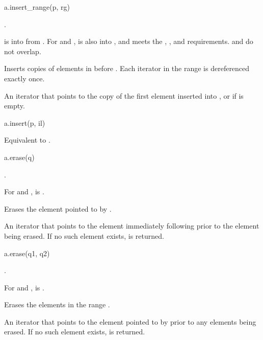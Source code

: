 %
\begin{itemdecl}
a.insert_range(p, rg)
\end{itemdecl}

\begin{itemdescr}
\pnum
\result
{}.

\pnum
\expects
{} is  into 
from .
For  and ,
 is also
 into ,
and  meets the
,
, and
 requirements.
 and  do not overlap.

\pnum
\effects
Inserts copies of elements in  before .
Each iterator in the range  is dereferenced exactly once.

\pnum
\returns
An iterator
that points to the copy of the first element inserted into , or
 if  is empty.
\end{itemdescr}

\begin{itemdecl}
a.insert(p, il)
\end{itemdecl}

\begin{itemdescr}
\pnum
\effects
Equivalent to .
\end{itemdescr}

%
\begin{itemdecl}
a.erase(q)
\end{itemdecl}

\begin{itemdescr}
\pnum
\result
{}.

\pnum
\expects
For  and ,
 is .

\pnum
\effects
Erases the element pointed to by .

\pnum
\returns
An iterator that points to the element immediately following 
prior to the element being erased.
If no such element exists,  is returned.
\end{itemdescr}

\begin{itemdecl}
a.erase(q1, q2)
\end{itemdecl}

\begin{itemdescr}
\pnum
\result
{}.

\pnum
\expects
For  and ,  is .

\pnum
\effects
Erases the elements in the range \tcode{[q1, q2)}.

\pnum
\returns
An iterator that points to the element pointed to by 
prior to any elements being erased.
If no such element exists,  is returned.
\end{itemdescr}


